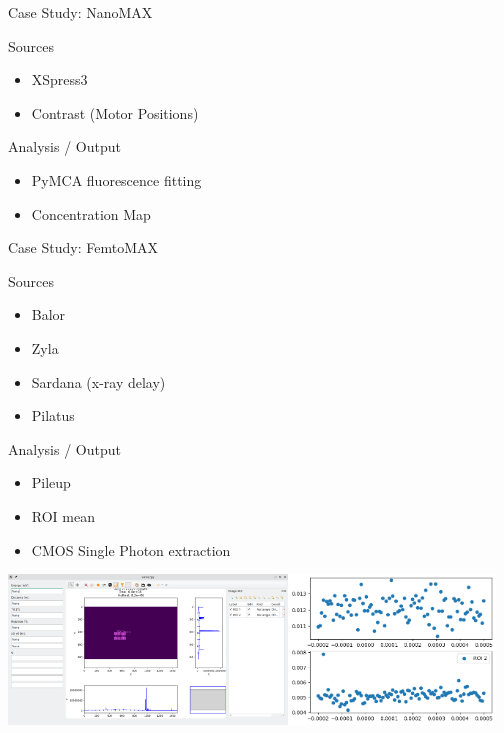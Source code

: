 \documentclass[aspectratio=169]{beamer}
\begin{document}
\begin{frame}{Case Study: NanoMAX}
  \begin{block}{Sources}
   \begin{itemize}
    \item XSpress3
    \item Contrast (Motor Positions)
   \end{itemize}
  \end{block}

  \begin{block}{Analysis / Output}
   \begin{itemize}
    \item PyMCA fluorescence fitting
    \item Concentration Map
   \end{itemize}
  \end{block}


\end{frame}

\begin{frame}{Case Study: FemtoMAX}
\begin{minipage}{0.5\textwidth}
\begin{block}{Sources}
   \begin{itemize}
    \item Balor
    \item Zyla
    \item Sardana (x-ray delay)
    \item Pilatus
   \end{itemize}
  \end{block}
\end{minipage}
\begin{minipage}{0.49\textwidth}
  \begin{block}{Analysis / Output}
   \begin{itemize}
    \item Pileup
    \item ROI mean
    \item CMOS Single Photon extraction
   \end{itemize}
  \end{block}
  \end{minipage}
  \vfill
\centering
\includegraphics[height=4cm]{img/femtomax}\includegraphics[height=4cm]{img/means}

\end{frame}
\end{document}
